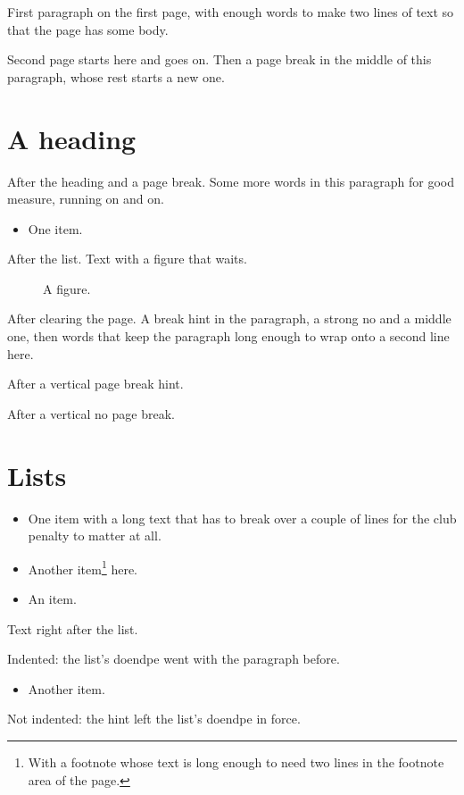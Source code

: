 \documentclass{article}
\begin{document}
First paragraph on the first page, with enough words to make two lines of text so that the page has some body.

\newpage
Second page starts here and goes on. Then a page break in the middle \newpage of this paragraph, whose rest starts a new one.

\section{A heading}
\newpage
After the heading and a page break. Some more words in this paragraph for good measure, running on and on.
\begin{itemize}
\item One item.
\end{itemize}
\newpage
After the list. Text with a figure that waits.
\begin{figure}[t]\centering\caption{A figure.}\end{figure}
\clearpage
After clearing the page. A \pagebreak[0] break hint in the paragraph, a \nopagebreak[2]strong no and a
\pagebreak[2] middle one, then words that keep the paragraph long enough to wrap onto a second line here.

\pagebreak[3]
After a vertical page break hint.

\nopagebreak
After a vertical no page break.

\section{Lists}
\begin{itemize}
\item One item with a long text that has to break over a couple of lines for the club penalty to matter at all.
\end{itemize}
\newpage
\begin{itemize}
\item Another item\footnote{With a footnote whose text is long enough to need two lines in the footnote area of the page.} here.
\end{itemize}
\begin{itemize}
\item An item.
\end{itemize}
Text right after the list.

\pagebreak[1]
Indented: the list's doendpe went with the paragraph before.
\begin{itemize}
\item Another item.
\end{itemize}
\nopagebreak[1]
Not indented: the hint left the list's doendpe in force.
\end{document}
